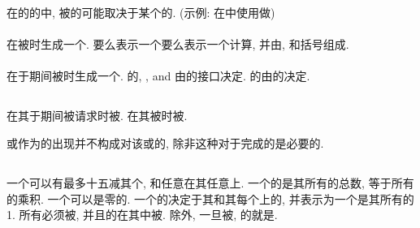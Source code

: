 在\Constant{}的\Subobject{}的\Object{}\Designator{}中, 被\Reference{}的\Portion{}可能取决于某个\Variable{}的\Value{}. (示例: 在\ArraySection{}中使用\IntegerType{}\Variable{}做\Index{})

\paragraph{\Expression{}}

\Expression{}在被\Evaluate{}时生成一个\Data{}\Entity{}. \Expression{}要么表示一个\Data{}\Object{}\Reference{}要么表示一个计算, 并由\Operand{}, \Operator{}和括号组成.

\paragraph{\Function{}\Reference{}}

\Function{}\Reference{}在\Function{}于\Expression{}\Evaluation{}期间被\Execute{}时生成一个\Data{}\Entity{}. \Function{}\Result{}的\Type{}, \TypeParameter{}, and \Rank{}由\Function{}的接口\Interface{}决定. \Function{}\Result{}的\Value{}由\Function{}的\Execution{}决定.

\subsection{\Reference{}}

\Data{}\Object{}在其\Value{}于\Execution{}期间被请求时被\Reference{}. \Procedure{}在其被\Execute{}时被\Reference{}.

\Data{}\Object{}\Designator{}或\Procedure{}\Designator{}作为\ActualArgument{}的出现并不构成对该\Data{}\Object{}或\Procedure{}的\Reference{}, 除非这种\Reference{}对于完成\ActualArgument{}的\Specification{}是必要的.

\subsection{\Array{}}

一个\Array{}可以有最多十五减其\Corank{}个\Dimension{}, 和任意\Extent{}在其任意\Dimension{}上. 一个\Array{}的\Size{}是其所有\Element{}的总数, 等于所有\Extent{}的乘积. 一个\Array{}可以是零\Size{}的. 一个\Array{}的\Shape{}决定于其\Rank{}和其每个\Dimension{}上的\Extent{}, 并表示为一个\Element{}是其所有\Extent{}的1\Rank{}\Array{}. 所有\Named{}\Array{}必须被\Declare{}, 并且\Named{}\Array{}的\Rank{}在其\Declaration{}中被\Specify{}. 除\AssumedRankArray{}外, 一旦被\Declare{}, \Named{}\Array{}的\Rank{}就是\Constant{}.

